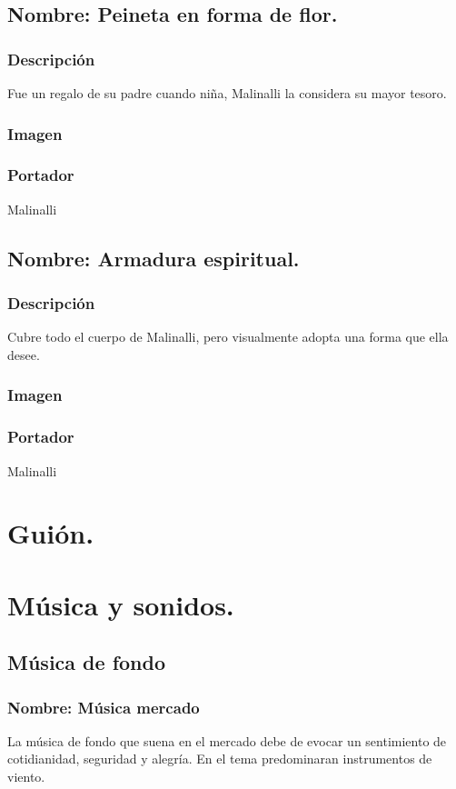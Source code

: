 \documentclass[11pt,letterpaper]{article}
\begin{document}
	\subsection{Nombre: Peineta en forma de flor.}
	\subsubsection{Descripción}
	Fue un regalo de su padre cuando niña, Malinalli la considera su mayor tesoro.
	\subsubsection{Imagen}
	\subsubsection{Portador}
	Malinalli 

	\subsection{Nombre: Armadura espiritual.}
	\subsubsection{Descripción}
	Cubre todo el cuerpo de Malinalli, pero visualmente adopta una forma que ella desee.
	\subsubsection{Imagen}
	\subsubsection{Portador}
	Malinalli 

\section{Guión.}

\section{Música  y sonidos.}
\subsection{Música  de fondo}
\subsubsection{Nombre: Música  mercado}
La música de fondo que suena en el mercado debe de evocar un sentimiento de cotidianidad, seguridad y alegría. En el tema predominaran instrumentos de viento. 		
\end{document}

